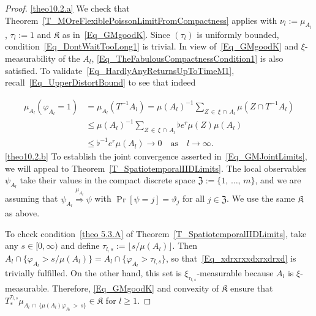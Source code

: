 \documentclass[AHL,Unicode,longabstracts]{cedram}
\newcommand{\frkK}{\mathfrak{K}}
\newcommand{\frkZ}{\mathfrak{Z}}
\begin{document}
\begin{proof}\leavevmode

\noindent\eqref{theo10.2.a} We check that Theorem~\ref{T_MOreFlexiblePoissonLimitFromCompactness} applies with $\nu_{l} :=\mu_{A_{l}}$, $\tau_{l}:=1$ and $\frkK$ as in~\eqref{Eq_GMgoodK}. Since $(\tau_{l})$ is uniformly bounded, condition~\eqref{Eq_DontWaitTooLong1} is trivial. In view of~\eqref{Eq_GMgoodK} and $\xi$-measurability of the $A_{l}$, \eqref{Eq_TheFabulousCompactnessCondition1} is also satisfied. To validate~\eqref{Eq_HardlyAnyReturnsUpToTimeM1}, recall~\eqref{Eq_UpperDistortBound} to see that indeed

\begin{align*}
\mu_{A_{l}}\left(\varphi_{A_{l}}=1\right) & =\mu_{A_{l}}\left(T^{-1}A_{l}\right) =\mu(A_{l})^{-1} {\textstyle\sum\nolimits_{Z\,\in\,\xi\,\cap\,A_{l}}}
\mu\left(Z\cap T^{-1}A_{l}\right)\\
& \leq\mu(A_{l})^{-1} {\textstyle\sum\nolimits_{Z\,\in\,\xi\,\cap\,A_{l}}}
\flat e^{r}\mu(Z)\mu(A_{l})\\
& \leq\flat^{-1}e^{r}\mu(A_{l})\longrightarrow0\quad\text{as}\quad l\rightarrow
\infty.
\end{align*}
\eqref{theo10.2.b} To establish the joint convergence asserted in~\eqref{Eq_GMJointLimits}, we will appeal to Theorem~\ref{T_SpatiotemporalIIDLimits}. The local observables $\psi_{A_{l}}$ take their values in the compact discrete space $\frkZ:=\{1,\,\ldots,\,m\}$, and we are assuming that $\psi_{A_{l}}\overset{\mu_{A_{l}}}{\Longrightarrow}\psi$ with $\Pr[\psi=j]=\vartheta_{j}$ for all $j\in\frkZ$. We use the same $\frkK$ as above.

To check condition~\eqref{theo 5.3.A} of Theorem~\ref{T_SpatiotemporalIIDLimits}, take any $s\in\lbrack0,\infty)$ and define $\tau_{l,s}:=\lfloor s/\mu (A_{l})\rfloor $. Then $A_{l}\cap\{\varphi_{A_{l}}>s/\mu(A_{l})\}=A_{l}\cap\{\varphi_{A_{l}}>\tau_{l,s}\}$, so that~\eqref{Eq_xdrxrxxdxrxdrxd} is trivially fulfilled. On the other hand, this set is $\xi_{\tau_{l,s}}$-measurable because $A_{l}$ is $\xi$-measurable. Therefore, \eqref{Eq_GMgoodK} and convexity of $\frkK$ ensure that $T_{\ast}^{\tau_{l,s}}\mu_{A_{l}\,\cap\,\{\mu(A_{l})\varphi_{A_{l}}\,>\,s\}}
\in\frkK$ for $l\geq1$.


\end{proof}
\end{document}
